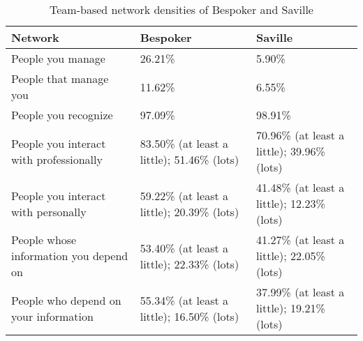 \begin{table}[tph]
\caption{\label{tab:NetworkClusters} Team-based network densities of Bespoker and Saville}
\centering
\footnotesize{\begin{tabular}{p{5.6cm}p{4.0cm}p{4.0cm}}
\hline \hline
\vspace{1pt} \bfseries Network & \vspace{1pt} \bfseries Bespoker & \vspace{1pt} \bfseries Saville \\
\hline
\vspace{0.5pt} People you manage & \vspace{0.5pt} 26.21\% & \vspace{0.5pt} 5.90\% \\
\hline
\vspace{0.5pt} People that manage you & \vspace{0.5pt} 11.62\% & \vspace{0.5pt} 6.55\% \\
\hline
\vspace{0.5pt} People you recognize & \vspace{0.5pt} 97.09\% & \vspace{0.5pt} 98.91\% \\
\hline
\vspace{0.5pt} People you interact with professionally & \vspace{0.5pt} 83.50\% (at least a little); 51.46\% (lots) & \vspace{0.5pt} 70.96\% (at least a little); 39.96\% (lots) \\
\hline
\vspace{0.5pt} People you interact with personally & \vspace{0.5pt} 59.22\% (at least a little); 20.39\% (lots) & \vspace{0.5pt} 41.48\% (at least a little); 12.23\% (lots) \\
\hline
\vspace{0.5pt} People whose information you depend on & \vspace{0.5pt} 53.40\% (at least a little); 22.33\% (lots) & \vspace{0.5pt} 41.27\% (at least a little); 22.05\% (lots) \\
\hline
\vspace{0.5pt} People who depend on your information & \vspace{0.5pt} 55.34\% (at least a little); 16.50\% (lots) & \vspace{0.5pt} 37.99\% (at least a little); 19.21\% (lots) \\
\hline
\end{tabular}}
\end{table}

